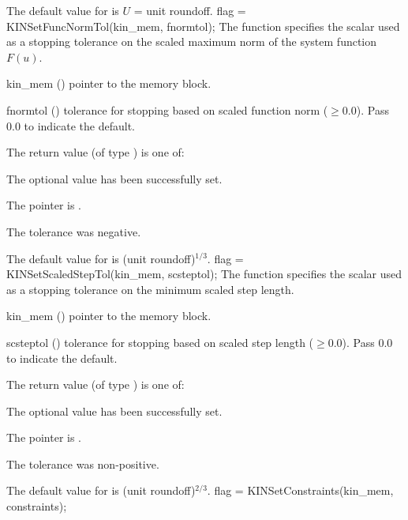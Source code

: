 {
  The default value for  is $U$ = unit roundoff.
}
{
flag = KINSetFuncNormTol(kin\_mem, fnormtol);
}
{
  The function  specifies the scalar used as a stopping
  tolerance on the scaled maximum norm of the system function $F(u)$.
}
{
  \begin{args}[fnormtol]
  \item[kin\_mem] ()
    pointer to the {\kinsol} memory block.
  \item[fnormtol] ()
    tolerance for stopping based on scaled function norm ($\geq 0.0$).
    Pass $0.0$ to indicate the default.
  \end{args}
}
{
  The return value  (of type ) is one of:
  \begin{args}
  \item[\Id{KIN\_SUCCESS}]
    The optional value has been successfully set.
  \item[\Id{KIN\_MEM\_NULL}]
    The  pointer is .
  \item[\Id{KIN\_ILL\_INPUT}]
    The tolerance was negative.
  \end{args}
}
{
  The default value for  is (unit roundoff)$^{1/3}$.
}
{
flag = KINSetScaledStepTol(kin\_mem, scsteptol);
}
{
  The function  specifies the scalar used
  as a stopping tolerance on the minimum scaled step length.
}
{
  \begin{args}[scsteptol]
  \item[kin\_mem] ()
    pointer to the {\kinsol} memory block.
  \item[scsteptol] ()
    tolerance for stopping based on scaled step length ($\geq 0.0$).
    Pass $0.0$ to indicate the default.
  \end{args}
}
{
  The return value  (of type ) is one of:
  \begin{args}
  \item[\Id{KIN\_SUCCESS}]
    The optional value has been successfully set.
  \item[\Id{KIN\_MEM\_NULL}]
    The  pointer is .
  \item[\Id{KIN\_ILL\_INPUT}]
    The tolerance was non-positive.
  \end{args}
}
{
  The default value for  is (unit roundoff)$^{2/3}$.
}
{
flag = KINSetConstraints(kin\_mem, constraints);
}

